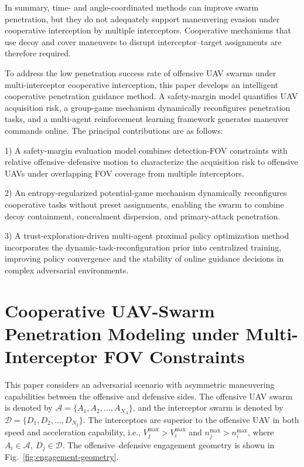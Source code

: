 \documentclass{cja}
\begin{document}
In summary, time- and angle-coordinated methods can improve swarm penetration, but they do not adequately support maneuvering evasion under cooperative interception by multiple interceptors. Cooperative mechanisms that use decoy and cover maneuvers to disrupt interceptor--target assignments are therefore required.

To address the low penetration success rate of offensive UAV swarms under multi-interceptor cooperative interception, this paper develops an intelligent cooperative penetration guidance method. A safety-margin model quantifies UAV acquisition risk, a group-game mechanism dynamically reconfigures penetration tasks, and a multi-agent reinforcement learning framework generates maneuver commands online. The principal contributions are as follows:

1) A safety-margin evaluation model combines detection-FOV constraints with relative offensive--defensive motion to characterize the acquisition risk to offensive UAVs under overlapping FOV coverage from multiple interceptors.

2) An entropy-regularized potential-game mechanism dynamically reconfigures cooperative tasks without preset assignments, enabling the swarm to combine decoy containment, concealment dispersion, and primary-attack penetration.

3) A trust-exploration-driven multi-agent proximal policy optimization method incorporates the dynamic-task-reconfiguration prior into centralized training, improving policy convergence and the stability of online guidance decisions in complex adversarial environments.

\section{Cooperative UAV-Swarm Penetration Modeling under Multi-Interceptor FOV Constraints}
\label{sec:aircraft-model}

This paper considers an adversarial scenario with asymmetric maneuvering capabilities between the offensive and defensive sides. The offensive UAV swarm is denoted by $\mathcal{A}=\{A_1,A_2,\dots,A_{N_A}\}$, and the interceptor swarm is denoted by $\mathcal{D}=\{D_1,D_2,\dots,D_{N_I}\}$.
The interceptors are superior to the offensive UAV in both speed and acceleration capability, i.e., $V_j^{\max}>V_i^{\max}$ and $n_j^{\max}>n_i^{\max}$, where $A_i\in\mathcal A,\ D_j\in\mathcal D$.
The offensive--defensive engagement geometry is shown in Fig.~\ref{fig:engagement-geometry}.
\end{document}
